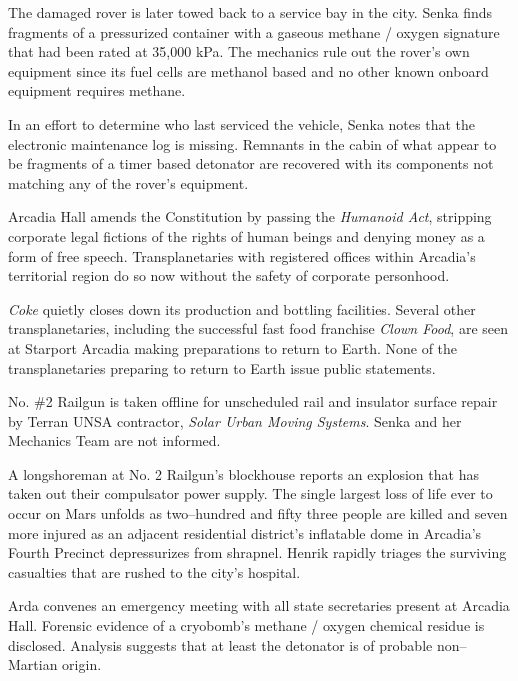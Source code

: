 The damaged rover is later towed back to a service bay in the city. Senka finds fragments of a pressurized container with a gaseous methane / oxygen signature that had been rated at 35,000 kPa. The mechanics rule out the rover's own equipment since its fuel cells are methanol based and no other known onboard equipment requires methane. 

In an effort to determine who last serviced the vehicle, Senka notes that the electronic maintenance log is missing. Remnants in the cabin of what appear to be fragments of a timer based detonator are recovered with its components not matching any of the rover's equipment.
\StopTimelineDate

Arcadia Hall amends the Constitution by passing the {\it Humanoid Act}, stripping corporate legal fictions of the rights of human beings and denying money as a form of free speech. Transplanetaries with registered offices within Arcadia's territorial region do so now without the safety of corporate personhood.
\StopTimelineDate

{\it Coke} quietly closes down its production and bottling facilities. Several other transplanetaries, including the successful fast food franchise {\it Clown Food}, are seen at Starport Arcadia making preparations to return to Earth. None of the transplanetaries preparing to return to Earth issue public statements.
\StopTimelineDate

No. \#2 Railgun is taken offline for unscheduled rail and insulator surface repair by Terran UNSA contractor, {\it Solar Urban Moving Systems}. Senka and her Mechanics Team are not informed.
\StopTimelineDate

A longshoreman at No. \type{#}2 Railgun's blockhouse reports an explosion that has taken out their compulsator power supply. The single largest loss of life ever to occur on Mars unfolds as two--hundred and fifty three people are killed and seven more injured as an adjacent residential district's inflatable dome in Arcadia's Fourth Precinct depressurizes from shrapnel. Henrik rapidly triages the surviving casualties that are rushed to the city's hospital.

Arda convenes an emergency meeting with all state secretaries present at Arcadia Hall. Forensic evidence of a cryobomb's methane / oxygen chemical residue is disclosed. Analysis suggests that at least the detonator is of probable non--Martian origin. 

